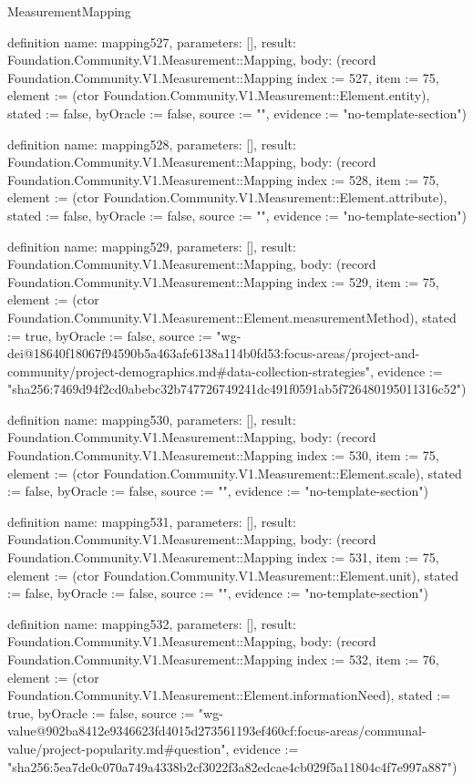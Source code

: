 \begin{lexlean}{MeasurementMapping}
\begin{semanticmodule}
definition{
  name: mapping527,
  parameters: [],
  result: Foundation.Community.V1.Measurement::Mapping,
  body: (record Foundation.Community.V1.Measurement::Mapping {index := 527, item := 75, element := (ctor Foundation.Community.V1.Measurement::Element.entity), stated := false, byOracle := false, source := "", evidence := "no-template-section"})
}

definition{
  name: mapping528,
  parameters: [],
  result: Foundation.Community.V1.Measurement::Mapping,
  body: (record Foundation.Community.V1.Measurement::Mapping {index := 528, item := 75, element := (ctor Foundation.Community.V1.Measurement::Element.attribute), stated := false, byOracle := false, source := "", evidence := "no-template-section"})
}

definition{
  name: mapping529,
  parameters: [],
  result: Foundation.Community.V1.Measurement::Mapping,
  body: (record Foundation.Community.V1.Measurement::Mapping {index := 529, item := 75, element := (ctor Foundation.Community.V1.Measurement::Element.measurementMethod), stated := true, byOracle := false, source := "wg-dei@18640f18067f94590b5a463afe6138a114b0fd53:focus-areas/project-and-community/project-demographics.md#data-collection-strategies", evidence := "sha256:7469d94f2cd0abebc32b747726749241dc491f0591ab5f726480195011316c52"})
}

definition{
  name: mapping530,
  parameters: [],
  result: Foundation.Community.V1.Measurement::Mapping,
  body: (record Foundation.Community.V1.Measurement::Mapping {index := 530, item := 75, element := (ctor Foundation.Community.V1.Measurement::Element.scale), stated := false, byOracle := false, source := "", evidence := "no-template-section"})
}

definition{
  name: mapping531,
  parameters: [],
  result: Foundation.Community.V1.Measurement::Mapping,
  body: (record Foundation.Community.V1.Measurement::Mapping {index := 531, item := 75, element := (ctor Foundation.Community.V1.Measurement::Element.unit), stated := false, byOracle := false, source := "", evidence := "no-template-section"})
}

definition{
  name: mapping532,
  parameters: [],
  result: Foundation.Community.V1.Measurement::Mapping,
  body: (record Foundation.Community.V1.Measurement::Mapping {index := 532, item := 76, element := (ctor Foundation.Community.V1.Measurement::Element.informationNeed), stated := true, byOracle := false, source := "wg-value@902ba8412e9346623fd4015d273561193ef460cf:focus-areas/communal-value/project-popularity.md#question", evidence := "sha256:5ea7de0c070a749a4338b2cf3022f3a82edcae4cb029f5a11804c4f7e997a887"})
}


\end{semanticmodule}
\end{lexlean}
